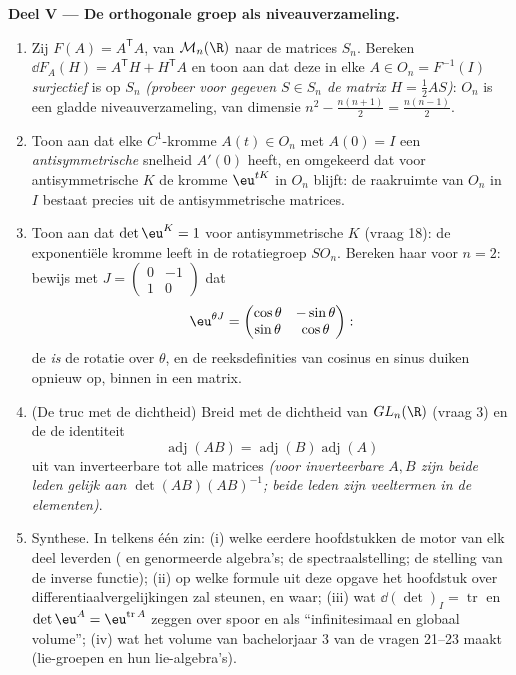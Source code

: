 \begin{problem}
\medskip
\noindent\textbf{Deel V --- De orthogonale groep als
niveauverzameling.}
\begin{enumerate}[resume]
  \item Zij $F(A) = A^{\mathsf T}A$, van $\mathcal M_n(\R)$ naar
        de  matrices $S_n$. Bereken $\dd F_A(H) =
        A^{\mathsf T}H + H^{\mathsf T}A$ en toon aan dat deze
         in elke $A \in O_n = F^{-1}(I)$
        \emph{surjectief} is op $S_n$ \emph{(probeer voor gegeven
        $S \in S_n$ de matrix $H = \frac12 AS$)}: $O_n$ is een
        gladde niveauverzameling, van dimensie $n^2 -
        \frac{n(n+1)}2 = \frac{n(n-1)}2$.
  \item Toon aan dat elke $C^1$-kromme $A(t) \in O_n$ met $A(0) =
        I$ een \emph{antisymmetrische} snelheid $A'(0)$ heeft, en
        omgekeerd dat voor antisymmetrische $K$ de kromme
        $\eu^{tK}$ in $O_n$ blijft: de raakruimte van $O_n$ in $I$
        bestaat precies uit de antisymmetrische matrices.
  \item Toon aan dat $\det\eu^{K} = 1$ voor antisymmetrische $K$
        (vraag 18): de exponentiële kromme leeft in de
        rotatiegroep $SO_n$. Bereken haar  voor $n = 2$:
        bewijs met $J = \begin{pmatrix}0 & -1\\ 1 &
        0\end{pmatrix}$ dat
        \[
        \eu^{\theta J} = \begin{pmatrix} \cos\theta &
        -\sin\theta\\ \sin\theta & \cos\theta\end{pmatrix} :
        \]
        de  \emph{is} de rotatie over $\theta$,
        en de reeksdefinities van cosinus en sinus duiken opnieuw
        op, binnen in een matrix.
  \item (De truc met de dichtheid) Breid met de dichtheid van
        $GL_n(\R)$ (vraag 3) en de  de identiteit
        \[
        \operatorname{adj}(AB) =
        \operatorname{adj}(B)\operatorname{adj}(A)
        \]
        uit van inverteerbare tot alle matrices \emph{(voor
        inverteerbare $A, B$ zijn beide leden gelijk aan
        $\det(AB)(AB)^{-1}$; beide leden zijn veeltermen in de
        elementen)}.
  \item Synthese. In telkens één zin: (i) welke eerdere
        hoofdstukken de motor van elk deel leverden (
        en genormeerde algebra's; de spectraalstelling; de
        stelling van de inverse functie); (ii) op welke formule
        uit deze opgave het hoofdstuk over
        differentiaalvergelijkingen zal steunen, en waar; (iii)
        wat $\dd(\det)_I = \operatorname{tr}$ en $\det\eu^A =
        \eu^{\operatorname{tr}A}$ zeggen over spoor en 
        als ``infinitesimaal en globaal volume''; (iv) wat het
        volume van bachelorjaar 3 van de vragen 21--23 maakt
        (lie-groepen en hun lie-algebra's).
\end{enumerate}
\end{problem}

